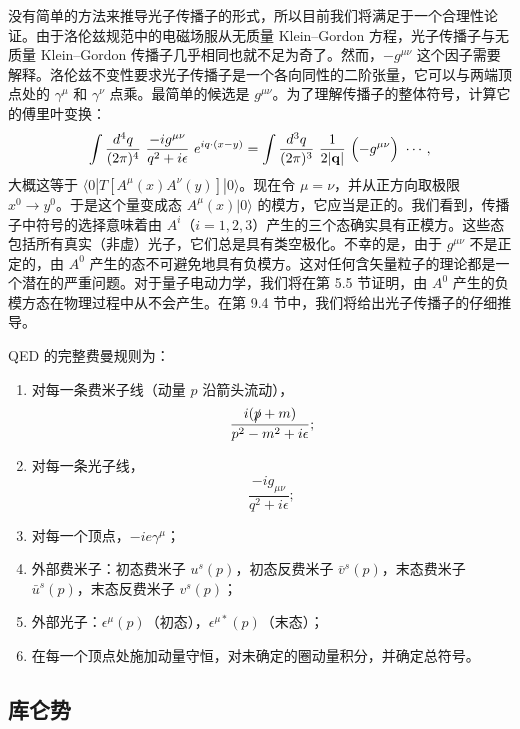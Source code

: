 没有简单的方法来推导光子传播子的形式，所以目前我们将满足于一个合理性论证。由于洛伦兹规范中的电磁场服从无质量 Klein--Gordon 方程，光子传播子与无质量 Klein--Gordon 传播子几乎相同也就不足为奇了。然而，$-g^{\mu\nu}$ 这个因子需要解释。洛伦兹不变性要求光子传播子是一个各向同性的二阶张量，它可以与两端顶点处的 $\gamma^\mu$ 和 $\gamma^\nu$ 点乘。最简单的候选是 $g^{\mu\nu}$。为了理解传播子的整体符号，计算它的傅里叶变换：
\begin{equation}
  \int \frac{d^4q}{(2\pi)^4}\ \frac{-ig^{\mu\nu}}{q^2+i\epsilon}\
    e^{iq\cdot(x-y)}
  = \int \frac{d^3q}{(2\pi)^3}\ \frac{1}{2|\mathbf{q}|}\
    \Bigl( -g^{\mu\nu} \Bigr)\ \cdots ,
  \label{eq:4.132b}
\end{equation}
大概这等于 $\langle 0|T[A^\mu(x)A^\nu(y)]|0\rangle$。现在令 $\mu = \nu$，并从正方向取极限 $x^0\to y^0$。于是这个量变成态 $A^\mu(x)|0\rangle$ 的模方，它应当是正的。我们看到，传播子中符号的选择意味着由 $A^i$（$i = 1, 2, 3$）产生的三个态确实具有正模方。这些态包括所有真实（非虚）光子，它们总是具有类空极化。不幸的是，由于 $g^{\mu\nu}$ 不是正定的，由 $A^0$ 产生的态不可避免地具有负模方。这对任何含矢量粒子的理论都是一个潜在的严重问题。对于量子电动力学，我们将在第 5.5 节证明，由 $A^0$ 产生的负模方态在物理过程中从不会产生。在第 9.4 节中，我们将给出光子传播子的仔细推导。

QED 的完整费曼规则为：
\begin{enumerate}
  \item 对每一条费米子线（动量 $p$ 沿箭头流动），
    \begin{equation}
      \frac{i(\slashed{p}+m)}{p^2-m^2+i\epsilon} ;
    \end{equation}
  \item 对每一条光子线，
    \begin{equation}
      \frac{-ig_{\mu\nu}}{q^2+i\epsilon} ;
    \end{equation}
  \item 对每一个顶点，$-ie\gamma^\mu$；
  \item 外部费米子：初态费米子 $u^s(p)$，初态反费米子 $\bar{v}^s(p)$，末态费米子 $\bar{u}^s(p)$，末态反费米子 $v^s(p)$；
  \item 外部光子：$\epsilon^\mu(p)$（初态），$\epsilon^{\mu*}(p)$（末态）；
  \item 在每一个顶点处施加动量守恒，对未确定的圈动量积分，并确定总符号。
\end{enumerate}

\subsection{库仑势}

